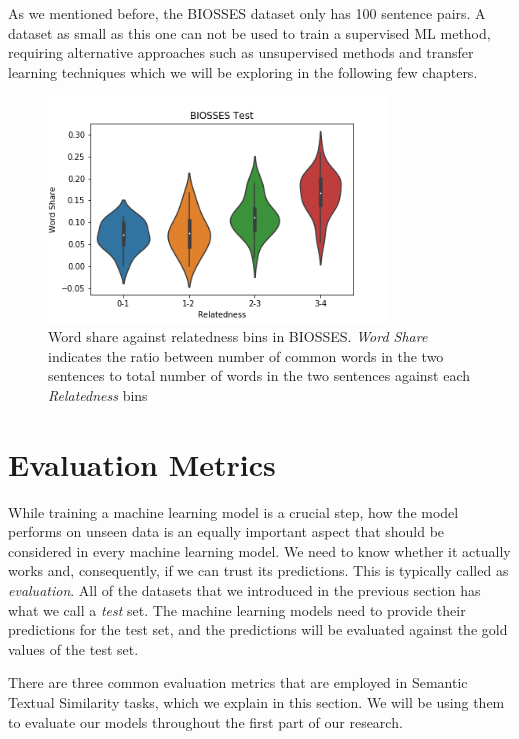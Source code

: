 \begin{enumerate}
As we mentioned before, the BIOSSES dataset only has 100 sentence pairs. A dataset as small as this one can not be used to train a supervised ML method, requiring alternative approaches such as unsupervised methods and transfer learning techniques which we will be exploring in the following few chapters.

\begin{figure}
	\centering
	\includegraphics[width=0.8\textwidth]{figures/semantic_textual_similarity/introduction/biosses_word_share.png}
	\caption[Word share against relatedness bins in BIOSSES.]{Word share against relatedness bins in BIOSSES. \textit{Word Share} indicates the ratio between number of common words in the two sentences to total number of words in the two sentences against each \textit{Relatedness} bins}
	\label{fig:biosses_word_share}
\end{figure}


\end{enumerate}

\section{Evaluation Metrics}
\label{sec:sts_evaluation}
While training a machine learning model is a crucial step, how the model performs on unseen data is an equally important aspect that should be considered in every machine learning model. We need to know whether it actually works and, consequently, if we can trust its predictions. This is typically called as \textit{evaluation}. All of the datasets that we introduced in the previous section has what we call a \textit{test} set. The machine learning models need to provide their predictions for the test set, and the predictions will be evaluated against the gold values of the test set. 

There are three common evaluation metrics that are employed in Semantic Textual Similarity tasks, which we explain in this section. We will be using them to evaluate our models throughout the first part of our research. 

